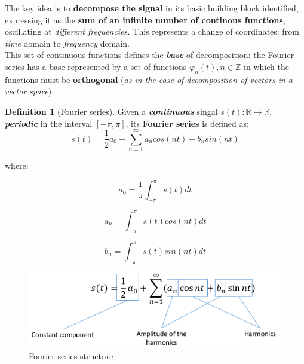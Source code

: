 \documentclass[10pt,a4paper]{report}
\theoremstyle{definition}
\newtheorem{definition}{Definition}[section]
\begin{document}
The key idea is to \textbf{decompose the signal} in its basic building block identified, expressing it as the \textbf{sum of an infinite number of continous functions}, oscillating at \textit{different frequencies.} This represents a change of coordinates: from \textit{time} domain to \textit{frequency} domain.\\
This set of continuous functions defines the \textit{\textbf{base}} of decomposition: the Fourier series has a base represented by a set of functions $\varphi_{n}(t), n \in \mathbb{Z}$ in which the functions must be \textbf{orthogonal} (\textit{as in the case of decomposition of vectors in a vector space}).\\


\begin{definition}[Fourier series]
	Given a \textit{\textbf{continuous}} singal $s(t):\mathbb{R} \rightarrow \mathbb{R}$, \textit{\textbf{periodic}} in the interval $[-\pi, \pi]$, its \textbf{Fourier series} is defined as:
	\begin{equation}
		s(t) = \frac{1}{2}a_{0}+\sum_{n=1}^{\infty}a_{n}cos(nt)+b_{n}sin(nt)
	\end{equation}
	
	where:

	
		\begin{equation}
				a_{0} = \frac{1}{\pi} \int_{-\pi}^{\pi} s(t)dt
		\end{equation}

		
		\begin{equation}
					a_{n}= \int_{-\pi}^{\pi} s(t)cos(nt)dt
		\end{equation}

		
		\begin{equation}
					b_{n}=\int_{-\pi}^{\pi} s(t)sin(nt)dt
		\end{equation}


	
	\begin{figure}[h]
		\centering\includegraphics[scale=0.50]{images/Pasted image 20230506100244.png}
		\caption{Fourier series structure}
	\end{figure}
\end{definition}
\end{document}
